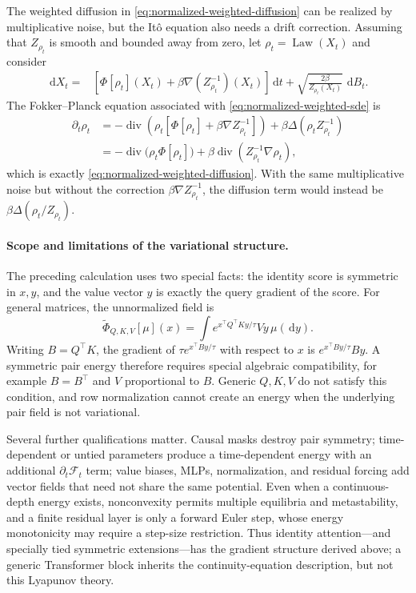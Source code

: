 \documentclass[11pt]{amsart}
\numberwithin{equation}{section}
\theoremstyle{plain}
\newcommand{\dd}{\,\mathrm{d}}
\DeclareMathOperator{\Law}{Law}
\DeclareMathOperator{\diver}{div}
\begin{document}
The weighted diffusion in
\eqref{eq:normalized-weighted-diffusion} can be realized by multiplicative
noise, but the It\^o equation also needs a drift correction.  Assuming that
$Z_{\rho_t}$ is smooth and bounded away from zero, let
$\rho_t=\Law(X_t)$ and consider
\begin{equation}\label{eq:normalized-weighted-sde}
\begin{aligned}
 \dd X_t={}&\left[\Phi[\rho_t](X_t)
 +\beta\nabla\left(Z_{\rho_t}^{-1}\right)(X_t)\right]\dd t +\sqrt{\frac{2\beta}{Z_{\rho_t}(X_t)}}\,\dd B_t.
 \end{aligned}
\end{equation}
The Fokker--Planck equation associated with
\eqref{eq:normalized-weighted-sde} is
\[
\begin{aligned}
 \partial_t\rho_t
 &=-\diver\left(\rho_t
    \left[\Phi[\rho_t]+\beta\nabla Z_{\rho_t}^{-1}\right]\right)
   +\beta\Delta\left(\rho_t Z_{\rho_t}^{-1}\right)\\
 &=-\diver\bigl(\rho_t\Phi[\rho_t]\bigr)
   +\beta\diver\left(Z_{\rho_t}^{-1}\nabla\rho_t\right),
 \end{aligned}
\]
which is exactly \eqref{eq:normalized-weighted-diffusion}. 
With the
same multiplicative noise but without the correction
$\beta\nabla Z_{\rho_t}^{-1}$, the diffusion term would instead be
$\beta\Delta(\rho_t/Z_{\rho_t})$.


\paragraph{\textbf{Scope and limitations of the variational structure.}}
The preceding calculation uses two special facts: the identity score is
symmetric in $x,y$, and the value vector $y$ is exactly the query gradient
of the score.  For general matrices, the unnormalized field is
\[
 \widetilde\Phi_{Q,K,V}[\mu](x)
 =\int e^{x^\top Q^\top Ky/\tau}Vy\,\mu(\dd y).
\]
Writing $B=Q^\top K$, the gradient of
$\tau e^{x^\top By/\tau}$ with respect to $x$ is
$e^{x^\top By/\tau}By$.  A symmetric pair energy therefore requires special
algebraic compatibility, for example $B=B^\top$ and $V$ proportional to
$B$. Generic $Q,K,V$ do not satisfy this condition, and row normalization
cannot create an energy when the underlying pair field is not variational.

Several further qualifications matter.  Causal masks destroy pair symmetry;
time-dependent or untied parameters produce a time-dependent energy with an
additional $\partial_t\mathcal F_t$ term; value biases, MLPs, normalization,
and residual forcing add vector fields that need not share the same potential.
Even when a continuous-depth energy exists, nonconvexity permits multiple
equilibria and metastability, and a finite residual layer is only a forward
Euler step, whose energy monotonicity may require a step-size restriction.
Thus identity attention---and specially tied symmetric extensions---has the
gradient structure derived above; a generic Transformer block inherits the
continuity-equation description, but not this Lyapunov theory.
\end{document}
